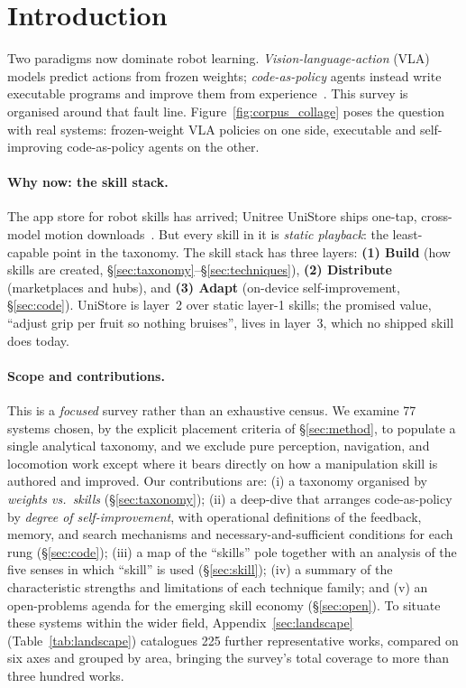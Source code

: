\section{Introduction}
\label{sec:intro}

Two paradigms now dominate robot learning. \emph{Vision-language-action} (VLA)
models predict actions from frozen weights; \emph{code-as-policy} agents instead
write executable programs and improve them from experience~\citep{codeaspolicies,aspire}.
This survey is organised around that fault line. Figure~\ref{fig:corpus_collage} poses the question
with real systems: frozen-weight VLA policies on one side, executable and self-improving
code-as-policy agents on the other.



\paragraph{Why now: the skill stack.}
The app store for robot skills has arrived; Unitree UniStore ships one-tap,
cross-model motion downloads~\citep{unistore2026}. But every skill in it is
\emph{static playback}: the least-capable point in the taxonomy. The skill stack has
three layers: \textbf{(1) Build} (how skills are created, \S\ref{sec:taxonomy}--\S\ref{sec:techniques}),
\textbf{(2) Distribute} (marketplaces and hubs), and \textbf{(3) Adapt} (on-device
self-improvement, \S\ref{sec:code}). UniStore is layer~2 over static layer-1 skills;
the promised value, ``adjust grip per fruit so nothing bruises'', lives in layer~3,
which no shipped skill does today.

\paragraph{Scope and contributions.}
This is a \emph{focused} survey rather than an exhaustive census. We examine 77 systems chosen,
by the explicit placement criteria of \S\ref{sec:method}, to populate a single analytical
taxonomy, and we exclude pure perception, navigation, and
locomotion work except where it bears directly on how a manipulation skill is authored and
improved. Our contributions are: (i) a taxonomy organised by \emph{weights vs.\ skills}
(\S\ref{sec:taxonomy}); (ii) a deep-dive that arranges code-as-policy by \emph{degree of
self-improvement}, with operational definitions of the feedback, memory, and search mechanisms
and necessary-and-sufficient conditions for each rung (\S\ref{sec:code}); (iii) a map of the
``skills'' pole together with an analysis of the five senses in which ``skill'' is used
(\S\ref{sec:skill}); (iv) a summary of the characteristic strengths and limitations of each
technique family; and (v) an open-problems agenda for the emerging skill economy
(\S\ref{sec:open}). To situate these systems within the wider field,
Appendix~\ref{sec:landscape} (Table~\ref{tab:landscape}) catalogues 225 further representative
works, compared on six axes and grouped by area, bringing the survey's total coverage to more than
three hundred works.

